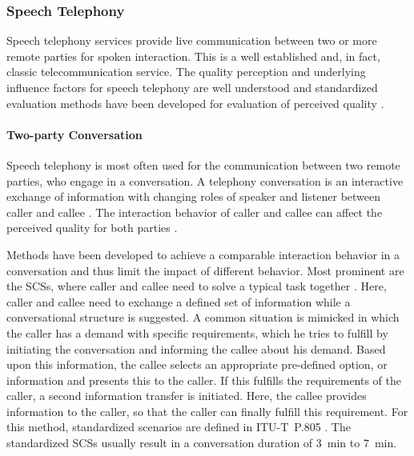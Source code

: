 \subsubsection*{Speech Telephony}\label{method:sct}
Speech telephony services provide live communication between two or more remote parties for spoken interaction.
This is a well established and, in fact, classic telecommunication service.
The quality perception and underlying influence factors for speech telephony are well understood and standardized evaluation methods have been developed for evaluation of perceived quality \citep[\eg,][]{itu_handbook_1992}.

\paragraph*{Two-party Conversation}
Speech telephony is most often used for the communication between two remote parties, who engage in a conversation.
A telephony conversation is an interactive exchange of information with changing roles of speaker and listener between caller and callee \citep[][]{hopper_telephone_1992}.
The interaction behavior of caller and callee can affect the perceived quality for both parties \citep[\eg,][]{schoenenberg_why_2014, egger_it_2010}.

Methods have been developed to achieve a comparable interaction behavior in a conversation and thus limit the impact of different behavior.
Most prominent are the \acp{SCS}, where caller and callee need to solve a typical task together \citep[][p.~76]{moller_assessment_2000}.
Here, caller and callee need to exchange a defined set of information while a conversational structure is suggested.
A common situation is mimicked in which the caller has a demand with specific requirements, which he tries to fulfill by initiating the conversation and informing the callee about his demand.
Based upon this information, the callee selects an appropriate pre-defined option, or information and presents this to the caller.
If this fulfills the requirements of the caller, a second information transfer is initiated.
Here, the callee provides information to the caller, so that the caller can finally fulfill this requirement.
For this method, standardized scenarios are defined in ITU-T~P.805 \citep{itu-t_p.805:_2007}.
The standardized \acp{SCS} \citep{itu-t_p.805:_2007} usually result in a conversation duration of 3~min to 7~min.

